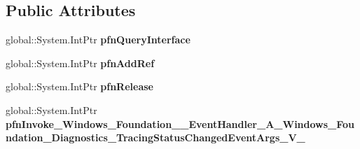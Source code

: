 \subsection*{Public Attributes}
\begin{DoxyCompactItemize}
\item 
\mbox{\label{struct_system_1_1_event_handler___a___windows___foundation___diagnostics___tracing_status_changedfe64b3ab054bcd8e33973c4cffad16b_ada369fa2aa8c0bfabe6ab9e647607a8d}} 
global\+::\+System.\+Int\+Ptr {\bfseries pfn\+Query\+Interface}
\item 
\mbox{\label{struct_system_1_1_event_handler___a___windows___foundation___diagnostics___tracing_status_changedfe64b3ab054bcd8e33973c4cffad16b_ae4bbfc2fca8e3cb0cd824064da9efd39}} 
global\+::\+System.\+Int\+Ptr {\bfseries pfn\+Add\+Ref}
\item 
\mbox{\label{struct_system_1_1_event_handler___a___windows___foundation___diagnostics___tracing_status_changedfe64b3ab054bcd8e33973c4cffad16b_a7ce230c0b0485ccb5e28aa8c85b3f95d}} 
global\+::\+System.\+Int\+Ptr {\bfseries pfn\+Release}
\item 
\mbox{\label{struct_system_1_1_event_handler___a___windows___foundation___diagnostics___tracing_status_changedfe64b3ab054bcd8e33973c4cffad16b_aa0ebbd7e4e43b5438c21474da95d4696}} 
global\+::\+System.\+Int\+Ptr {\bfseries pfn\+Invoke\+\_\+\+Windows\+\_\+\+Foundation\+\_\+\+\_\+\+Event\+Handler\+\_\+\+A\+\_\+\+Windows\+\_\+\+Foundation\+\_\+\+Diagnostics\+\_\+\+Tracing\+Status\+Changed\+Event\+Args\+\_\+\+V\+\_\+}
\end{DoxyCompactItemize}
